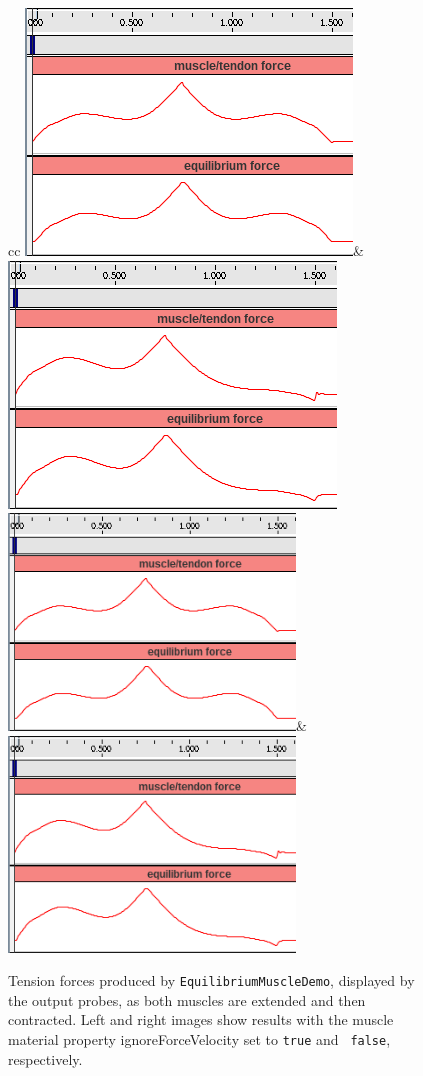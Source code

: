 \begin{figure}[ht]
\begin{center}
\begin{tabular}{cc}
\iflatexml
 \includegraphics[]{images/EquilibriumMuscleForcesIFV}&
 \includegraphics[]{images/EquilibriumMuscleForces}
\else
 \includegraphics[width=3in]{images/EquilibriumMuscleForcesIFV}&
 \includegraphics[width=3in]{images/EquilibriumMuscleForces}
\fi
\end{tabular}
\end{center}
\caption{Tension forces produced by {\tt EquilibriumMuscleDemo},
displayed by the output probes, as both muscles are extended and then
contracted. Left and right images show results with the muscle
material property {\sf ignoreForceVelocity} set to {\tt true} and {\tt
false}, respectively.}
\label{EquilibriumMuscleForces:fig}
\end{figure}

